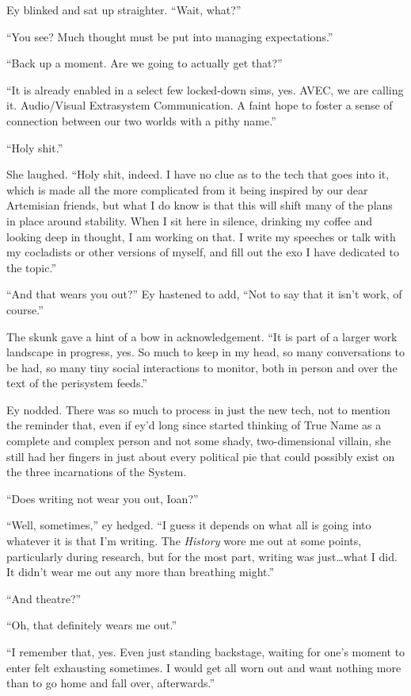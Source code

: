 Ey blinked and sat up straighter. ``Wait, what?''

``You see? Much thought must be put into managing expectations.''

``Back up a moment. Are we going to actually get that?''

``It is already enabled in a select few locked-down sims, yes. AVEC, we are calling it. Audio/Visual Extrasystem Communication. A faint hope to foster a sense of connection between our two worlds with a pithy name.''

``Holy shit.''

She laughed. ``Holy shit, indeed. I have no clue as to the tech that goes into it, which is made all the more complicated from it being inspired by our dear Artemisian friends, but what I do know is that this will shift many of the plans in place around stability. When I sit here in silence, drinking my coffee and looking deep in thought, I am working on that. I write my speeches or talk with my cocladists or other versions of myself, and fill out the exo I have dedicated to the topic.''

``And that wears you out?'' Ey hastened to add, ``Not to say that it isn't work, of course.''

The skunk gave a hint of a bow in acknowledgement. ``It is part of a larger work landscape in progress, yes. So much to keep in my head, so many conversations to be had, so many tiny social interactions to monitor, both in person and over the text of the perisystem feeds.''

Ey nodded. There was so much to process in just the new tech, not to mention the reminder that, even if ey'd long since started thinking of True Name as a complete and complex person and not some shady, two-dimensional villain, she still had her fingers in just about every political pie that could possibly exist on the three incarnations of the System.

``Does writing not wear you out, Ioan?''

``Well, sometimes,'' ey hedged. ``I guess it depends on what all is going into whatever it is that I'm writing. The \emph{History} wore me out at some points, particularly during research, but for the most part, writing was just\ldots what I did. It didn't wear me out any more than breathing might.''

``And theatre?''

``Oh, that definitely wears me out.''

``I remember that, yes. Even just standing backstage, waiting for one's moment to enter felt exhausting sometimes. I would get all worn out and want nothing more than to go home and fall over, afterwards.''

